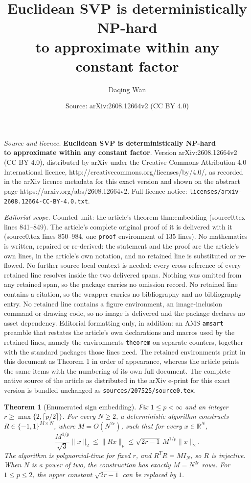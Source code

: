 \documentclass[10pt,a4paper]{amsart}
\title{\textbf{Euclidean SVP is deterministically NP-hard\\ to approximate within any constant factor}}
\author{Daqing Wan}
\date{Source: arXiv:2608.12664v2 (CC BY 4.0)}
\newtheorem{theorem}{Theorem}
\newcommand{\R}{\mathbb R}
\begin{document}
\maketitle

\noindent\emph{Source and licence.} \textbf{Euclidean SVP is deterministically NP-hard\\ to approximate within any constant factor}. Version arXiv:2608.12664v2 (CC BY 4.0), distributed by arXiv under the Creative Commons Attribution 4.0 International licence, http://creativecommons.org/licenses/by/4.0/, as recorded in the arXiv licence metadata for this exact version and shown on the abstract page https://arxiv.org/abs/2608.12664v2. Full licence notice: \texttt{licenses/arxiv-2608.12664-CC-BY-4.0.txt}.\par\smallskip

\noindent\textit{Editorial scope.} Counted unit: the article's theorem thm:embedding (source0.tex lines 841--849). The article's complete original proof of it is delivered with it (source0.tex lines 850--984, one \texttt{proof} environment of 135 lines). No mathematics is written, repaired or re-derived: the statement and the proof are the article's own lines, in the article's own notation, and no retained line is substituted or re-flowed.  No further source-local context is needed: every cross-reference of every retained line resolves inside the two delivered spans.  Nothing was omitted from any retained span, so the package carries no omission record.  No retained line contains a citation, so the wrapper carries no bibliography and no bibliography entry.  No retained line contains a figure environment, an image-inclusion command or drawing code, so no image is delivered and the package declares no asset dependency.  Editorial formatting only, in addition: an AMS \texttt{amsart} preamble that restates the article's own declarations and macros used by the retained lines, namely the environments \texttt{theorem} on separate counters, together with the standard packages those lines need.  The retained environments print in this document as Theorem 1 in order of appearance, whereas the article prints the same items with the numbering of its own full document.  The complete native source of the article as distributed in the arXiv e-print for this exact version is bundled unchanged as \texttt{sources/207525/source0.tex}.
\begin{theorem}[Enumerated sign embedding]\label{thm:embedding}
Fix $1\le p<\infty$ and an integer $r\ge\max\{2,\lceil p/2\rceil\}$. For every $N\ge2$, a deterministic algorithm constructs $R\in\{-1,1\}^{M\times N}$, where $M=O(N^{2r})$, such that for every $x\in\R^N$,
\begin{equation}\label{eq:embedding}
 \frac{M^{1/p}}{\sqrt3}\|x\|_2
 \le\|Rx\|_p
 \le\sqrt{2r-1}\,M^{1/p}\|x\|_2.
\end{equation}
The algorithm is polynomial-time for fixed $r$, and $R^TR=MI_N$, so $R$ is injective. When $N$ is a power of two, the construction has exactly $M=N^{2r}$ rows. For $1\le p\le2$, the upper constant $\sqrt{2r-1}$ can be replaced by $1$.
\end{theorem}
\end{document}
